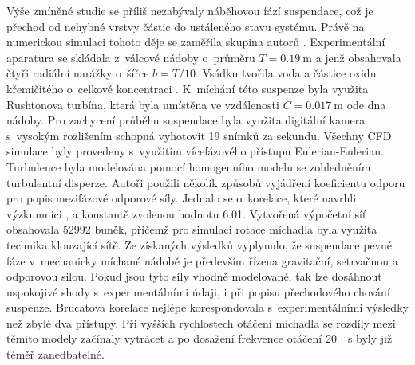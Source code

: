 Výše zmíněné studie se příliš nezabývaly náběhovou fází suspendace, což je přechod od nehybné vrstvy částic do ustáleného stavu systému. Právě na numerickou simulaci tohoto děje se zaměřila skupina autorů \citet{tamb09}. Experimentální aparatura se skládala z~válcové nádoby o~průměru $T=\SI{0.19}{\meter}$ a jenž obsahovala čtyři radiální narážky o~šířce $b=T/10$. Vsádku tvořila voda a částice oxidu křemičitého o~celkové koncentraci . K~míchání této suspenze byla využita Rushtonova turbína, která byla umístěna ve vzdálenosti $C=\SI{0.017}{\meter}$ ode dna nádoby. Pro zachycení průběhu suspendace byla využita digitální kamera s~vysokým rozlišením schopná vyhotovit \num{19} snímků za sekundu. Všechny CFD simulace byly provedeny s~využitím vícefázového přístupu Eulerian-Eulerian. Turbulence byla modelována pomocí homogenního \keps{} modelu se zohledněním turbulentní disperze. Autoři použili několik způsobů vyjádření koeficientu odporu pro popis mezifázové odporové síly. Jednalo se o~korelace, které navrhli výzkumníci \citet{cli78}, \citet{bru98} a konstantě zvolenou hodnotu \num{6.01}. Vytvořená výpočetní síť obsahovala \num{52992} buněk, přičemž pro simulaci rotace míchadla byla využita technika klouzající sítě. Ze získaných výsledků vyplynulo, že suspendace pevné fáze v~mechanicky míchané nádobě je především řízena gravitační, setrvačnou a odporovou silou. Pokud jsou tyto síly vhodně modelované, tak lze dosáhnout uspokojivé shody s~experimentálními údaji, i při popisu přechodového chování suspenze. Brucatova korelace nejlépe korespondovala s~experimentálními výsledky než zbylé dva přístupy. Při vyšších rychlostech otáčení míchadla se rozdíly mezi těmito modely začínaly vytrácet a po dosažení frekvence otáčení \SI{20}{\per\second} byly již téměř zanedbatelné.

